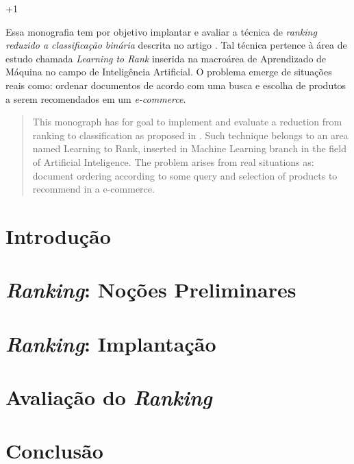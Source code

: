 \documentclass[12pt, a4paper, normaltoc, capchap, capsec, times]{abnt}
\begin{document}
\looseness+1

\begin{resumo}
Essa monografia tem por objetivo implantar e avaliar a técnica de \emph{ranking reduzido a classificação binária} descrita no artigo \cite{langford08}. Tal técnica pertence à área de estudo chamada \emph{Learning to Rank} inserida na macroárea de Aprendizado de Máquina no campo de Inteligência Artificial. O problema emerge de situações reais como: ordenar documentos de acordo com uma busca e escolha de produtos a serem recomendados em um \emph{e-commerce}.
\end{resumo}

\begin{abstract}
This monograph has for goal to implement and evaluate a reduction from ranking to classification as proposed in \cite{langford08}. Such technique belongs to an area named Learning to Rank, inserted in Machine Learning branch in the field of Artificial Inteligence. The problem arises from real situations as: document ordering according to some query and selection of products to recommend in a e-commerce.
\end{abstract}

\chapter{Introdução}
\label{chap:introducao}


\chapter{\emph{Ranking}: Noções Preliminares}
\label{chap:nocoes_preliminares}


\chapter{\emph{Ranking}: Implantação}
\label{chap:implantacao}


\chapter{Avaliação do \emph{Ranking}}
\label{chap:avaliacao}


\chapter{Conclusão}
\label{chap:conclusao}



\end{document}
